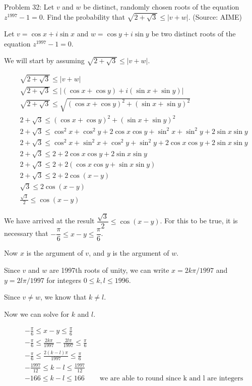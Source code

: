 Problem 32: Let $v$ and $w$ be distinct, randomly chosen roots of the equation $z^{1997} - 1 = 0$. Find the probability that $\sqrt{2 + \!\sqrt{3}} \le |v + w|$. (Source: AIME)

Let $v = \cos x + i \sin x$ and $w = \cos y + i \sin y$ be two distinct roots of the equation $z^{1997} - 1 = 0$.

We will start by assuming $\sqrt{2 + \sqrt 3} \leq |v + w|$. 

\begin{align*}
& \sqrt{2 + \sqrt 3} \leq |v + w| \\
& \sqrt{2 + \sqrt 3} \leq |(\cos x + \cos y) + i (\sin x + \sin y)| \\
& \sqrt{2 + \sqrt 3} \leq \sqrt{(\cos x + \cos y)^2 + (\sin x + \sin y)^2} \\
& 2 + \sqrt 3 \leq (\cos x + \cos y)^2 + (\sin x + \sin y)^2 \\
& 2 + \sqrt 3 \leq \cos^2 x + \cos^2 y + 2 \cos x \cos y + \sin^2 x + \sin^2 y + 2\sin x \sin y \\
& 2 + \sqrt 3 \leq \cos^2 x + \sin^2 x + \cos^2 y + \sin^2 y + 2 \cos x \cos y + 2\sin x \sin y \\
& 2 + \sqrt 3 \leq 2 + 2\cos x \cos y + 2\sin x \sin y \\
& 2 + \sqrt 3 \leq 2 + 2(\cos x \cos y + \sin x \sin y) \\
& 2 + \sqrt 3 \leq 2 + 2\cos (x - y) \\
& \sqrt 3 \leq 2\cos (x - y) \\
& \frac{\sqrt 3}{2} \leq \cos (x - y)
\end{align*}

We have arrived at the result $\dfrac{\sqrt 3}{2} \leq \cos (x - y)$. For this to be true, it is necessary that $-\dfrac{\pi}{6} \leq x - y \leq \dfrac{\pi}{6}$.

Now $x$ is the argument of $v$, and $y$ is the argument of $w$. 

Since $v$ and $w$ are 1997th roots of unity, we can write $x = 2k\pi / 1997$ and $y = 2l\pi / 1997$ for integers $0 \leq k, l \leq 1996$. 

Since $v \neq w$, we know that $k \neq l$.

Now we can solve for $k$ and $l$.

\begin{align*}
& -\frac{\pi}{6} \leq x - y \leq \frac{\pi}{6} \\
& -\frac{\pi}{6} \leq \frac{2k\pi}{1997} - \frac{2l\pi}{1997} \leq \frac{\pi}{6} \\
& -\frac{\pi}{6} \leq \frac{2(k-l)\pi}{1997} \leq \frac{\pi}{6} \\
& -\frac{1997}{12} \leq k - l \leq \frac{1997}{12} \\
& -166 \leq k - l \leq 166 &\quad \text{we are able to round since k and l are integers} \\
\end{align*}

